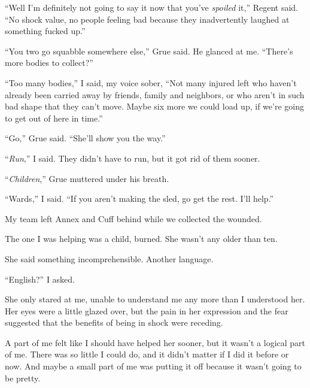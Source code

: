``Well I'm definitely not going to say it now that you've \emph{spoiled} it,'' Regent said.  ``No shock value, no people feeling bad because they inadvertently laughed at something fucked up.''



``You two go squabble somewhere else,'' Grue said.  He glanced at me.  ``There's more bodies to collect?''



``Too many bodies,'' I said, my voice sober, ``Not many injured left who haven't already been carried away by friends, family and neighbors, or who aren't in such bad shape that they can't move.  Maybe six more we could load up, if we're going to get out of here in time.''



``Go,'' Grue said.  ``She'll show you the way.''



``\emph{Run},'' I said.  They didn't have to run, but it got rid of them sooner.



``\emph{Children},'' Grue muttered under his breath.



``Wards,'' I said.  ``If you aren't making the sled, go get the rest.  I'll help.''



My team left Annex and Cuff behind while we collected the wounded.



The one I was helping was a child, burned.  She wasn't any older than ten.



She said something incomprehensible.  Another language.



``English?'' I asked.



She only stared at me, unable to understand me any more than I understood her.  Her eyes were a little glazed over, but the pain in her expression and the fear suggested that the benefits of being in shock were receding.



A part of me felt like I should have helped her sooner, but it wasn't a logical part of me.  There was so little I could do, and it didn't matter if I did it before or now.  And maybe a small part of me was putting it off because it wasn't going to be pretty.



